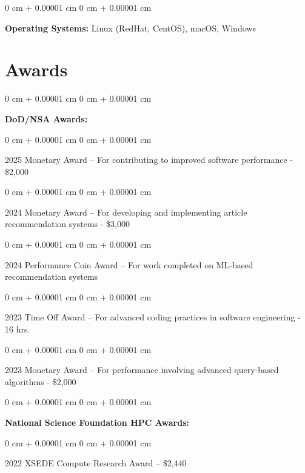 \documentclass[10pt, letterpaper]{article}
\newenvironment{onecolentry}{
    \begin{adjustwidth}{
        0 cm + 0.00001 cm
    }{
        0 cm + 0.00001 cm
    }
}{
    \end{adjustwidth}
} %
\begin{document}
\vspace{0.2 cm}

\begin{onecolentry}
    \textbf{Operating Systems:} Linux (RedHat, CentOS), macOS, Windows
\end{onecolentry}

\section{Awards}

\begin{onecolentry}
    \textbf{DoD/NSA Awards:}
\end{onecolentry}

\vspace{0.1 cm}

\begin{onecolentry}
    2025 Monetary Award – For contributing to improved software performance - \$2,000
\end{onecolentry}

\begin{onecolentry}
    2024 Monetary Award – For developing and implementing article recommendation systems - \$3,000
\end{onecolentry}

\begin{onecolentry}
    2024 Performance Coin Award – For work completed on ML-based recommendation systems
\end{onecolentry}

\begin{onecolentry}
    2023 Time Off Award – For advanced coding practices in software engineering - 16 hrs.
\end{onecolentry}

\begin{onecolentry}
    2023 Monetary Award – For performance involving advanced query-based algorithms - \$2,000
\end{onecolentry}

\vspace{0.3 cm}

\begin{onecolentry}
    \textbf{National Science Foundation HPC Awards:}
\end{onecolentry}

\vspace{0.1 cm}

\begin{onecolentry}
    2022 XSEDE Compute Research Award – \$2,440
\end{onecolentry}
\end{document}
